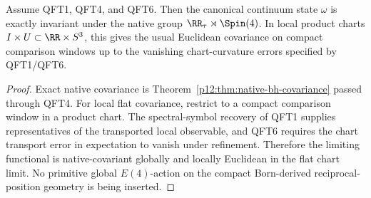 \documentclass[12pt,a4paper]{article}
\begin{document}
\begin{lemma}
\label{p12:lem:euc-invariance-survives}
Assume QFT1, QFT4, and QFT6.  Then the canonical continuum state \(\omega\) is exactly invariant under the native group \(\RR_\tau\rtimes\Spin(4)\).  In local product charts \(I\times U\subset\RR\times S^3\), this gives the usual Euclidean covariance on compact comparison windows up to the vanishing chart-curvature errors specified by QFT1/QFT6.
\end{lemma}
\begin{proof}
Exact native covariance is Theorem~\ref{p12:thm:native-bh-covariance} passed through QFT4.  For local flat covariance, restrict to a compact comparison window in a product chart.  The spectral-symbol recovery of QFT1 supplies representatives of the transported local observable, and QFT6 requires the chart transport error in expectation to vanish under refinement.  Therefore the limiting functional is native-covariant globally and locally Euclidean in the flat chart limit.  No primitive global \(E(4)\)-action on the compact Born-derived reciprocal-position geometry is being inserted.
\end{proof}
\end{document}
